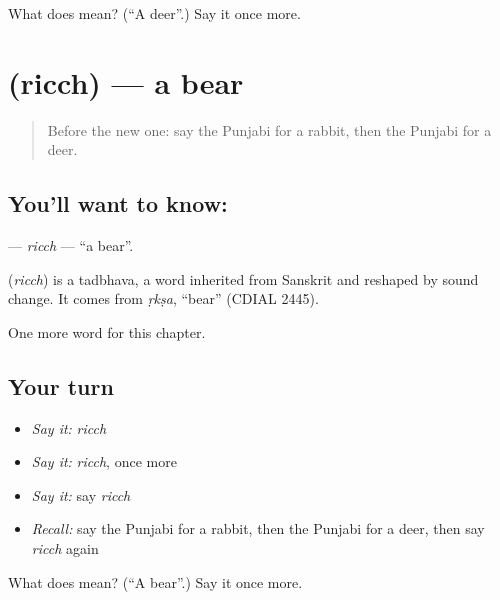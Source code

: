 \begin{tcolorbox}[breakable,colback=teal!4,colframe=teal!35!black,title={Before you move on}]
What does  mean? (\textquotedblleft{}A deer\textquotedblright{}.) Say it once more.
\end{tcolorbox}
\section[\texorpdfstring{\pa{ਰਿੱਛ} (ricch)}{ਰਿੱਛ (ricch)}]{ (ricch) — a bear}

\label{lesson:PA-C130-ricch}



\begin{quote}
Before the new one: say the Punjabi for a rabbit, then the Punjabi for a deer.
\end{quote}

\subsection*{You'll want to know: }
\textbf{} — \emph{ricch} — \textquotedblleft{}a bear\textquotedblright{}.

\begin{cousinweb}
\textbf{} (\emph{ricch}) is a tadbhava, a word inherited from Sanskrit and reshaped by sound change. It comes from \emph{ṛkṣa}, \textquotedblleft{}bear\textquotedblright{} (CDIAL 2445).
\end{cousinweb}

\begin{grammarlens}[title={What you've built}]
One more word for this chapter.
\end{grammarlens}

\subsection*{Your turn}
\begin{itemize}
\raggedright
  \item \emph{Say it:} \emph{ricch}
  \item \emph{Say it:} \emph{ricch}, once more
  \item \emph{Say it:} say \emph{ricch}
  \item \emph{Recall:} say the Punjabi for a rabbit, then the Punjabi for a deer, then say \emph{ricch} again
\end{itemize}

\begin{tcolorbox}[breakable,colback=teal!4,colframe=teal!35!black,title={Before you move on}]
What does  mean? (\textquotedblleft{}A bear\textquotedblright{}.) Say it once more.
\end{tcolorbox}
